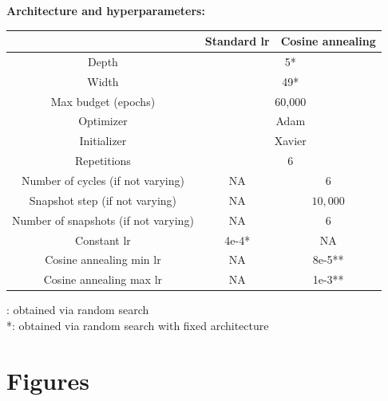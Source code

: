 \noindent
\textbf{Architecture and hyperparameters:}
\begin{center}
	\begin{tabular}{ | c || c| c|} 
		\hline
		 & Standard lr & Cosine annealing	\\
		\hline
		Depth & \multicolumn{2}{c|}{5*} \\
		\hline
		Width  & \multicolumn{2}{c|}{49*} \\
		\hline
		Max budget (epochs)& \multicolumn{2}{c|}{60,000} \\
		\hline
		Optimizer& \multicolumn{2}{c|}{Adam} \\
		\hline
		Initializer& \multicolumn{2}{c|}{Xavier} \\
		\hline
		Repetitions& \multicolumn{2}{c|}{6} \\
		\hline
		Number of cycles (if not varying) &  NA & 6\\ 
		\hline
		Snapshot step (if not varying) & NA  & $10,000$\\ 
		\hline
		Number of snapshots (if not varying) &  NA  & 6\\ 
		\hline
		Constant lr & 4e-4* & NA\\ 
		\hline
		Cosine annealing min lr & NA & 8e-5**\\ 
		\hline
		Cosine annealing max lr & NA & 1e-3**\\ 
		\hline
	\end{tabular}
\end{center}
\noindent *: obtained via random search \\
\noindent **: obtained via random search with fixed architecture

\section{Figures}

